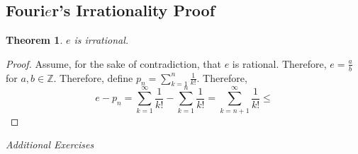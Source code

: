 \documentclass[openany, amssymb, psamsfonts]{amsart}
\newcommand{\bbZ}{\mathbb{Z}}
\newtheorem{thm}{Theorem}[section]
\theoremstyle{definition}
\numberwithin{equation}{section}
\begin{document}
\subsection*{Fouri$e$r's Irrationality Proof}
\begin{thm}
\label{16.18.1}
    $e$ is irrational.
\end{thm}
\begin{proof}
    Assume, for the sake of contradiction, that $e$ is rational. Therefore, $e = \frac{a}{b}$ for $a,b \in \bbZ.$ Therefore, define $p_n = \displaystyle\sum_{k=1}^n\frac{1}{k!}.$ Therefore, \[e - p_n = \displaystyle\sum_{k=1}^\infty\frac{1}{k!} - \displaystyle\sum_{k=1}^n\frac{1}{k!} = \displaystyle\sum_{k=n+1}^\infty \frac{1}{k!}\leq \]
\end{proof}

\newpage
\begin{center}
{\em Additional Exercises}
\end{center}
\end{document}
